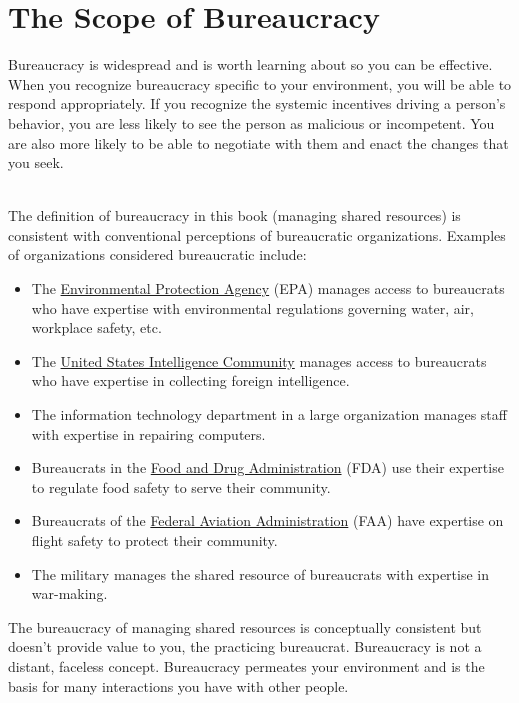 \section{The Scope of Bureaucracy}
Bureaucracy is widespread and is worth learning about so you can be effective.  When you recognize bureaucracy specific to your environment, you will be able to respond appropriately. If you recognize the systemic incentives driving a person's behavior, you are less likely to see the person as malicious or incompetent. You are also more likely to be able to negotiate with them and enact the changes that you seek.

\ \\

The definition of bureaucracy in this book (managing \glspl{shared resource}) is consistent with conventional perceptions of bureaucratic organizations. 
Examples of organizations considered bureaucratic include:
  \begin{itemize}
      \item The \href{https://www.epa.gov/}{Environmental Protection Agency} (EPA) manages access to bureaucrats who have expertise with environmental regulations governing water, air, workplace safety, etc.
      \item The \href{https://www.intelligence.gov/}{United States Intelligence Community} manages access to bureaucrats who have expertise in collecting foreign intelligence.
      \item The information technology department in a large organization manages staff with expertise in repairing computers.%
      \item Bureaucrats in the \href{https://www.fda.gov/}{Food and Drug Administration} (FDA) use their expertise to regulate food safety to serve their community.%
      \item Bureaucrats of the \href{https://www.faa.gov/}{Federal Aviation Administration} (FAA) have expertise on flight safety to protect their community.%
      \item The military manages the shared resource of bureaucrats with expertise in war-making.
  \end{itemize}

The bureaucracy of managing shared resources is conceptually consistent but doesn't provide value to you, the practicing bureaucrat. Bureaucracy is not a distant, faceless concept. Bureaucracy permeates your environment and is the basis for many interactions you have with other people. 

